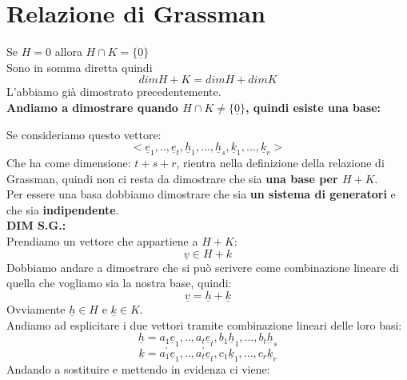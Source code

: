 \section{Relazione di Grassman}
Se $H = {0}$ allora $H \cap K =\{\underline{0}\}$\\
Sono in somma diretta quindi $$dim H+K = dim H + dim K$$
L'abbiamo già dimostrato precedentemente.\\
\textbf{Andiamo a dimostrare quando $H\cap K \neq \{\underline{0}\}$, quindi esiste una base:}
Se consideriamo questo vettore:
$$ <\underline{e}_1,.., \underline{e}_t, \underline{h}_1,..., \underline{h}_s, \underline{k}_1,..., \underline{k}_r>  $$
Che ha come dimensione: $t+s+r$, rientra nella definizione della relazione di Grassman, quindi non ci resta da dimostrare che sia \textbf{una base per $H+K$}.\\
Per essere una basa dobbiamo dimostrare che sia \textbf{un sistema di generatori} e che sia \textbf{indipendente}.\\
\textbf{DIM S.G.:}\\
Prendiamo un vettore che appartiene a $H+K$:
$$ \underline{v} \in H+k $$
Dobbiamo andare a dimostrare che si può scrivere come combinazione lineare di quella che vogliamo sia la nostra base, quindi:
$$ \underline{v}=\underline{h}+\underline{k} $$
Ovviamente $\underline{h} \in H$ e $\underline{k} \in K$.\\
Andiamo ad esplicitare i due vettori tramite combinazione lineari delle loro basi:
$$ \underline{h}= a_1\underline{e}_1,.., a_t\underline{e}_t, b_1\underline{h}_1,..., b_t\underline{h}_s $$
$$ \underline{k}= a^{\prime}_1\underline{e}_1,.., a^{\prime}_t\underline{e}_t, c_1\underline{k}_1,..., c_r\underline{k}_r$$
Andando a sostituire e mettendo in evidenza ci viene:

